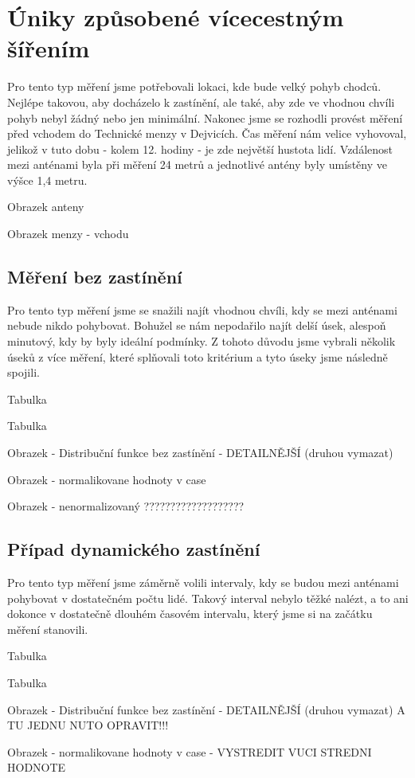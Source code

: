 \chapter{Úniky způsobené vícecestným šířením}
Pro tento typ měření jsme potřebovali lokaci, kde bude velký pohyb chodců. Nejlépe takovou, aby docházelo k zastínění, ale také, aby zde ve vhodnou chvíli pohyb nebyl žádný nebo jen minimální. Nakonec jsme se rozhodli provést měření před vchodem do Technické menzy v Dejvicích. Čas měření nám velice vyhovoval, jelikož v tuto dobu - kolem 12. hodiny - je zde největší hustota lidí. Vzdálenost mezi anténami byla při měření 24 metrů a jednotlivé antény byly umístěny ve výšce 1,4 metru.

Obrazek anteny

Obrazek menzy - vchodu

\section{Měření bez zastínění}
Pro tento typ měření jsme se snažili najít vhodnou chvíli, kdy se mezi anténami nebude nikdo pohybovat. Bohužel se nám nepodařilo najít delší úsek, alespoň minutový, kdy by byly ideální podmínky. Z tohoto důvodu jsme vybrali několik úseků z více měření, které splňovali toto kritérium a tyto úseky jsme následně spojili.

Tabulka

Tabulka

Obrazek - Distribuční funkce bez zastínění - DETAILNĚJŠÍ (druhou vymazat)

Obrazek - normalikovane hodnoty v case

Obrazek - nenormalizovaný ???????????????????

\section{Případ dynamického zastínění}
Pro tento typ měření jsme záměrně volili intervaly, kdy se budou mezi anténami pohybovat v dostatečném počtu lidé. Takový interval nebylo těžké nalézt, a to ani dokonce v dostatečně dlouhém časovém intervalu, který jsme si na začátku měření stanovili.

Tabulka

Tabulka

Obrazek - Distribuční funkce bez zastínění - DETAILNĚJŠÍ (druhou vymazat) A TU JEDNU NUTO OPRAVIT!!!

Obrazek - normalikovane hodnoty v case - VYSTREDIT VUCI STREDNI HODNOTE


